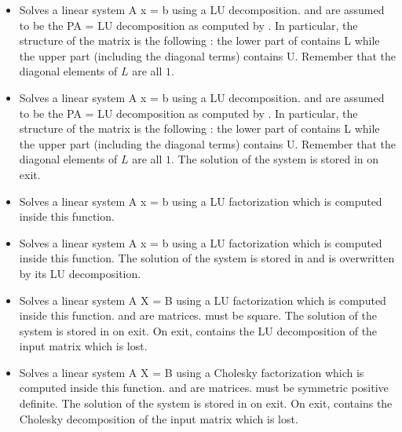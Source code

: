 \begin{itemize}
\item {} 
  \sshortdescribe Solves a linear system A x = b using a LU decomposition.
   and  are assumed to be the PA = LU decomposition as computed
  by . In particular, the structure of the matrix 
  is the following : the lower part of  contains L while the upper part
  (including the diagonal terms) contains U. Remember that the diagonal
  elements of $L$ are all $1$.

\item {} 
  \sshortdescribe Solves a linear system A x = b using a LU decomposition.
   and  are assumed to be the PA = LU decomposition as computed
  by . In particular, the structure of the matrix 
  is the following : the lower part of  contains L while the upper part
  (including the diagonal terms) contains U. Remember that the diagonal
  elements of $L$ are all $1$. The solution of the system is stored in 
  on exit.
  
\item {} 
  \sshortdescribe Solves a linear system A x = b using a LU factorization
  which is computed inside this function.

\item {} 
  \sshortdescribe Solves a linear system A x = b using a LU factorization
  which is computed inside this function. The solution of the system is stored
  in  and  is overwritten by its LU decomposition.

\item {} 
  \sshortdescribe Solves a linear system A X = B using a LU factorization
  which is computed inside this function.  and   are
  matrices.  must be square. The solution of the system is stored in
   on exit. On exit,  contains the LU decomposition of the input
  matrix which is lost.

\item {}
  \sshortdescribe Solves a linear system A X = B
  using a Cholesky factorization which is computed inside this
  function.  and  are matrices.  must be symmetric
  positive definite. The solution of the system is stored in  on
  exit. On exit,  contains the Cholesky decomposition of the input
  matrix which is lost.
\end{itemize}


